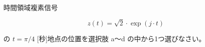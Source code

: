 時間領域複素信号 

\[
z(t) = \sqrt{2} \cdot \exp(j \cdot t) 
\]

\medskip
\noindent の $t = \pi/4$ [秒]地点の位置を選択肢 a〜d の中から1つ選びなさい。
